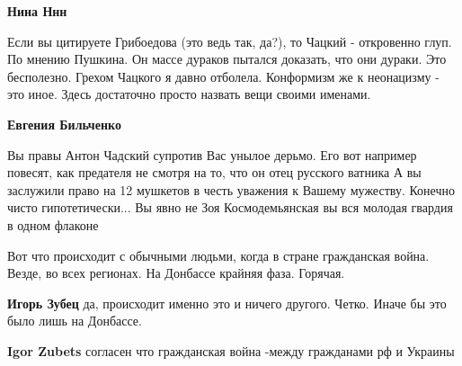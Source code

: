 \begin{itemize}
\begin{itemize}
\textbf{Нина Ннн} 

Если вы цитируете Грибоедова (это ведь так, да?), то Чацкий - откровенно глуп.
По мнению Пушкина. Он массе дураков пытался доказать, что они дураки. Это
бесполезно. Грехом Чацкого я давно отболела. Конформизм же к неонацизму - это
иное. Здесь достаточно просто назвать вещи своими именами.


 
\textbf{Евгения Бильченко} 

Вы правы Антон Чадский супротив Вас унылое дерьмо. Его вот например повесят,
как предателя не смотря на то, что он отец русского ватника \Smiley[1.0][yellow] А вы заслужили
право на 12 мушкетов в честь уважения к Вашему мужеству. Конечно чисто
гипотетически... Вы явно не Зоя Космодемьянская вы вся молодая гвардия в одном
флаконе \Smiley[1.0][yellow]

\end{itemize}

 

Вот что происходит с обычными людьми, когда в стране гражданская война. Везде,
во всех регионах. На Донбассе крайняя фаза. Горячая.

\begin{itemize}
 
\textbf{Игорь Зубец} да, происходит именно это и ничего другого. Четко. Иначе бы это было лишь на Донбассе.

 
\textbf{Igor Zubets} согласен что гражданская война -между гражданами рф и Украины


\end{itemize}
\end{itemize}
